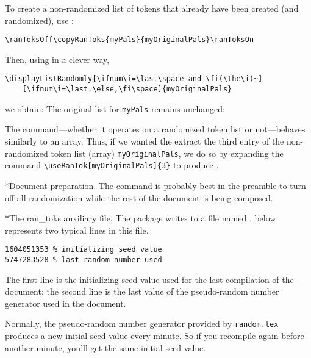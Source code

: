 \documentclass{article}
\makeatletter
\renewcommand{\paragraph}
    {\@startsection{paragraph}{4}{0pt}{6pt}{-3pt}
    {\normalfont\normalsize\bfseries}}
\renewcommand{\subparagraph}
    {\@startsection{subparagraph}{5}{\parindent}{6pt}{-3pt}%
    {\normalfont\normalsize\bfseries}}
\let\amtIndent\leftmargini
\makeatother
\begin{document}
To create a non-randomized list of tokens that already have been created (and randomized), use
:
\begin{Verbatim}[xleftmargin=\amtIndent]
\ranToksOff\copyRanToks{myPals}{myOriginalPals}\ranToksOn
\end{Verbatim}
Then, using  in a clever way,
\begin{Verbatim}[xleftmargin=\amtIndent]
\displayListRandomly[\ifnum\i=\last\space and \fi(\the\i)~]
    [\ifnum\i=\last.\else,\fi\space]{myOriginalPals}
\end{Verbatim}
we obtain: \ranToksOff{}\ranToksOn
{}
The original list for \texttt{myPals} remains unchanged:

The  command---whether it operates on a randomized token list
or not---behaves similarly to an array. Thus, if we wanted the extract
the third entry of the non-randomized token list (array)
\texttt{myOriginalPals}, we do so by expanding the command
\verb!\useRanTok[myOriginalPals]{3}! to produce
.

\subparagraph*{Document preparation.}
The command  is probably best in the preamble to turn off
all randomization while the rest of the document is being composed.

\paragraph*{The \textsf{ran\_toks} auxiliary file.} The package writes to a file named
, below represents two typical lines in this file.
\begin{Verbatim}[xleftmargin=\amtIndent]
1604051353 % initializing seed value
5747283528 % last random number used
\end{Verbatim}
The first line is the initializing seed value used for the last
compilation of the document; the second line is the last value of the
pseudo-random number generator used in the document.

Normally, the pseudo-random number generator provided by
\texttt{random.tex} produces a new initial seed value every minute. So if
you recompile again before another minute, you'll get the same initial
seed value.
\end{document}
